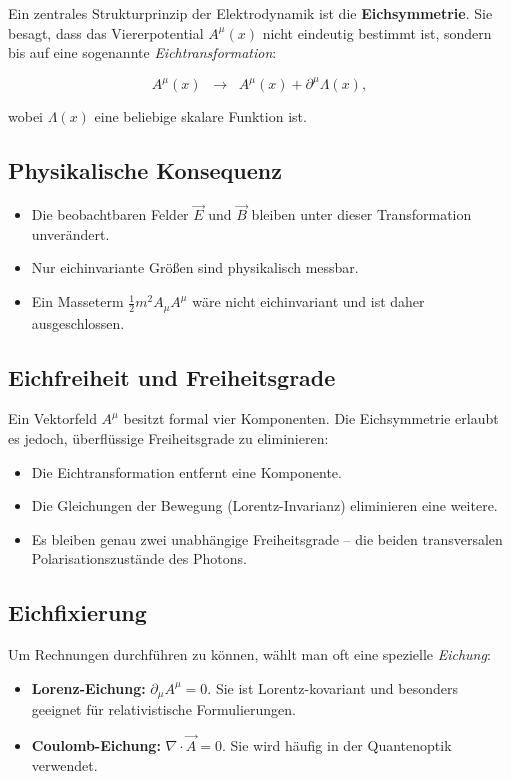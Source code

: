 Ein zentrales Strukturprinzip der Elektrodynamik ist die \textbf{Eichsymmetrie}.
Sie besagt, dass das Viererpotential \( A^\mu(x) \) nicht eindeutig bestimmt ist,
sondern bis auf eine sogenannte \emph{Eichtransformation}:

\[
A^\mu(x) \;\;\rightarrow\;\; A^\mu(x) + \partial^\mu \Lambda(x),
\]

wobei \( \Lambda(x) \) eine beliebige skalare Funktion ist.

\subsection*{Physikalische Konsequenz}
\begin{itemize}
	\item Die beobachtbaren Felder \( \vec{E} \) und \( \vec{B} \) 
	bleiben unter dieser Transformation unverändert.
	\item Nur eichinvariante Größen sind physikalisch messbar.
	\item Ein Masseterm \( \tfrac{1}{2} m^2 A_\mu A^\mu \) 
	wäre nicht eichinvariant und ist daher ausgeschlossen.
\end{itemize}

\subsection*{Eichfreiheit und Freiheitsgrade}
Ein Vektorfeld \( A^\mu \) besitzt formal vier Komponenten.  
Die Eichsymmetrie erlaubt es jedoch, überflüssige Freiheitsgrade zu eliminieren:
\begin{itemize}
	\item Die Eichtransformation entfernt eine Komponente.
	\item Die Gleichungen der Bewegung (Lorentz-Invarianz) 
	eliminieren eine weitere.
	\item Es bleiben genau zwei unabhängige Freiheitsgrade – 
	die beiden transversalen Polarisationszustände des Photons.
\end{itemize}

\subsection*{Eichfixierung}
Um Rechnungen durchführen zu können, wählt man oft eine spezielle \emph{Eichung}:
\begin{itemize}
	\item \textbf{Lorenz-Eichung:} 
	\(\partial_\mu A^\mu = 0\).  
	Sie ist Lorentz-kovariant und besonders geeignet für relativistische Formulierungen.
	\item \textbf{Coulomb-Eichung:} 
	\(\nabla \cdot \vec{A} = 0\).  
	Sie wird häufig in der Quantenoptik verwendet.
\end{itemize}

